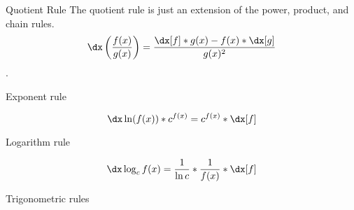 \begin{psec}{Quotient Rule}\label{rule:derivative quotient} The quotient rule is just an extension of the
    power, product, and chain rules.
    \begin{equation}
        \dx \left(\frac{f(x)}{g(x)}\right) = \frac{\dx[f] * g(x) - f(x) * \dx[g]
        }{g(x)^2}
    \end{equation}.

\end{psec}

\begin{psec}{Exponent rule}\label{rule:derivative exponent}

    \begin{equation}
        \dx \ln(f(x)) * c ^ {f(x)} = c ^ {f(x)} * \dx[f]
    \end{equation}

\end{psec}

\begin{psec}{Logarithm rule}\label{rule:derivative log}

    \begin{equation}
        \dx \log_c f(x) = \frac{1}{\ln c} * \frac{1}{f(x)} * \dx[f]
    \end{equation}

\end{psec}


\begin{psec}{Trigonometric rules}


\end{psec}
